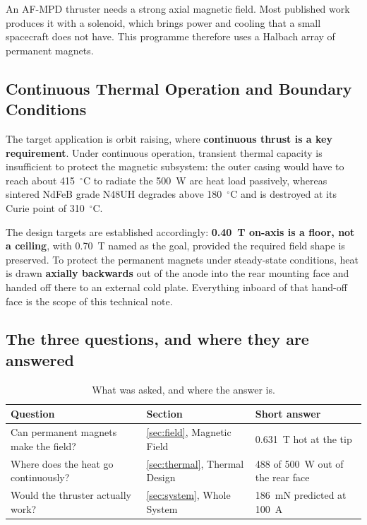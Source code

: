 \documentclass[11pt,a4paper]{article}
\newcommand{\degC}{$^\circ$C}
\begin{document}
An AF-MPD thruster needs a strong axial magnetic field. Most published work
produces it with a solenoid, which brings power and cooling that a small
spacecraft does not have. This programme therefore uses a Halbach array of
permanent magnets.

\subsection{Continuous Thermal Operation and Boundary Conditions}
The target application is orbit raising, where \textbf{continuous thrust is a key requirement}.
Under continuous operation, transient thermal capacity is insufficient to protect the
magnetic subsystem: the outer casing would have to reach about 415~\degC{} to radiate the
500~W arc heat load passively, whereas sintered NdFeB grade N48UH degrades above 180~\degC{}
and is destroyed at its Curie point of 310~\degC.

The design targets are established accordingly: \textbf{0.40~T on-axis is a floor, not
a ceiling}, with 0.70~T named as the goal, provided the required field shape is preserved.
To protect the permanent magnets under steady-state conditions, heat is drawn
\textbf{axially backwards} out of the anode into the rear mounting face and handed off
there to an external cold plate. Everything inboard of that hand-off face is the scope
of this technical note.

\subsection{The three questions, and where they are answered}

\begin{table}[H]
\centering
\caption{What was asked, and where the answer is.}
\label{tab:questions}
\begin{tabular}{p{7.4cm}p{3.2cm}p{3.4cm}}
\toprule
\textbf{Question} & \textbf{Section} & \textbf{Short answer} \\
\midrule
Can permanent magnets make the field? &
\ref{sec:field}, Magnetic Field &
0.631~T hot at the tip \\
Where does the heat go continuously? &
\ref{sec:thermal}, Thermal Design &
488 of 500~W out of the rear face \\
Would the thruster actually work? &
\ref{sec:system}, Whole System &
186~mN predicted at 100~A \\
\bottomrule
\end{tabular}
\end{table}
\end{document}
